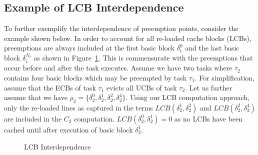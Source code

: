 \subsection {Example of LCB Interdependence}\label{sec:example_lcb_interdependence}
\indent
To further exemplify the interdependence of preemption points, consider the example shown below.  In order to account for all re-loaded cache blocks (LCBs), preemptions are always included at the first basic block  ${\delta_i^{0}}$ and the last basic block ${\delta_i^{N_i}}$ as shown in Figure~\ref{fig:lcb_ex}.  This is commensurate with the preemptions that occur before and after the task executes.  Assume we have two tasks where ${\tau_2}$ contains four basic blocks which may be preempted by task ${\tau_1}$.  For simplification, assume that the ECBs of task ${\tau_1}$ evicts all UCBs of task ${\tau_2}$.  Let us further assume that we have ${\rho_2 = \{\delta_2^0, \delta_2^1, \delta_2^2, \delta_2^4\}}$.  Using our LCB computation approach, only the re-loaded lines as captured in the terms ${LCB(\delta_2^1, \delta_2^2)}$ and ${LCB(\delta_2^2, \delta_2^4)}$ are included in the ${C_2}$ computation.  ${LCB(\delta_2^0, \delta_2^1)} = 0$ as no LCBs have been cached until after execution of basic block $\delta_2^1$.


\begin{figure}[!htb]
  \centering
  \def\svgwidth{250pt}
  
  \vspace{5pt}
  \caption{LCB Interdependence}
  \label{fig:lcb_ex}
\end{figure}

%
%
